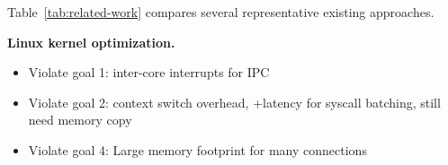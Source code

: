 \begin{table}[t]
	\centering
{}
	\caption{Comparison of high performance socket systems.}
	\label{tab:related-work}
\end{table}

Table~\ref{tab:related-work} compares several representative existing approaches. %

\textbf{Linux kernel optimization.}

\begin{itemize}
	\item
	Violate goal 1: inter-core interrupts for IPC 
	\item
	Violate goal 2: context switch overhead, +latency for syscall batching, still need memory copy 
	\item 
	Violate goal 4: Large memory footprint for many connections 
\end{itemize}

